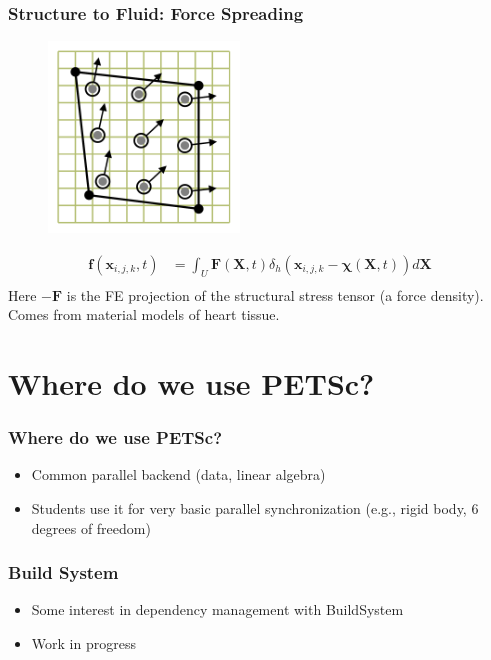 \documentclass[8pt]{beamer}
\begin{document}
\begin{frame}
    \frametitle{Structure to Fluid: Force Spreading}
    \begin{figure}
        \includegraphics[width=2in]{gquad2d_4a-632.pdf}
    \end{figure}
    \begin{align*}
        \mathbf{f}(\mathbf{x}_{i,j,k}, t) &=
        \int_U \mathbf{F}(\mathbf{X}, t)
        \delta_h(\mathbf{x}_{i,j,k} - \mathbf{\chi}(\mathbf{X}, t))
        d \mathbf{X}                                                          \\
    \end{align*}
    Here \(-\mathbf{F}\) is the FE projection of the structural stress tensor (a
    force density). Comes from material models of heart tissue.
\end{frame}

\section{Where do we use PETSc?}
\begin{frame}
    \frametitle{Where do we use PETSc?}
    \begin{itemize}
        \item Common parallel backend (data, linear algebra)
        \item Students use it for very basic parallel synchronization (e.g.,
              rigid body, 6 degrees of freedom)
    \end{itemize}
\end{frame}

\begin{frame}
    \frametitle{Build System}
    \begin{itemize}
        \item Some interest in dependency management with BuildSystem
        \item Work in progress
    \end{itemize}
\end{frame}
\end{document}
